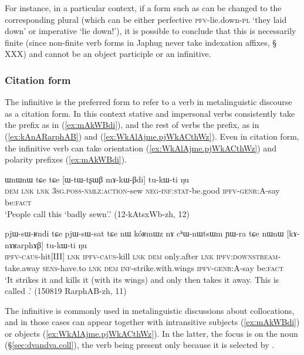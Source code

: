 For instance, in a particular context, if a form such as  can be changed to the corresponding plural  (which can be either perfective \textsc{pfv}-lie.down-\textsc{pl} `they laid down' or imperative `lie down!'), it is possible to conclude that this  is necessarily finite (since non-finite verb forms in Japhug never take indexation affixes, § XXX) and cannot be an object participle or an infinitive.

\subsubsection{Citation form} \label{sec:inf.citation}
The infinitive is the preferred form to refer to a verb in metalinguistic discourse as a citation form. In this context stative and impersonal verbs consistently take the  prefix as in (\ref{ex:mAkWBdi}), and the rest of verbs the  prefix, as in (\ref{ex:kAnARarphAB}) and (\ref{ex:WkAlAjme.pjWkACthWz}). Even in citation form, the infinitive verb can take orientation (\ref{ex:WkAlAjme.pjWkACthWz}) and polarity prefixes (\ref{ex:mAkWBdi}).  

\begin{exe}
\ex  \label{ex:mAkWBdi}
 \gll ɯnɯnɯ tɕe tɕe [ɯ-tɯ-tʂɯβ mɤ-kɯ-βdi] tu-kɯ-ti ŋu \\ 
 \textsc{dem} \textsc{lnk} \textsc{lnk} \textsc{3sg.poss-nmlz:action}-sew \textsc{neg-inf:stat}-be.good  \textsc{ipfv-genr}:A-say be:\textsc{fact}  \\
\glt `People call this `badly sewn'.'  (12-kAtsxWb-zh, 12)
\end{exe}

\begin{exe}
\ex \label{ex:kAnARarphAB}
 \gll  pjɯ-sɯ-ʁndi tɕe pjɯ-sɯ-sat tɕe nɯ kóʁmɯz nɤ cʰɯ-nɯtsɯm ɲɯ-ra tɕe nɯnɯ [kɤ-nɤʁarphɤβ] tu-kɯ-ti ŋu  \\
 \textsc{ipfv-caus}-hit[III]  \textsc{lnk} \textsc{ipfv-caus}-kill \textsc{lnk} \textsc{dem} only.after \textsc{lnk} \textsc{ipfv:downstream}-take.away \textsc{sens}-have.to \textsc{lnk} \textsc{dem} \textsc{inf}-strike.with.wings \textsc{ipfv-genr}:A-say be:\textsc{fact}  \\
 \glt `It strikes it and kills it (with its wings) and only then takes it away. This is called .' (150819 RarphAB-zh, 11)
\end{exe}

The infinitive is commonly used in metalinguistic discussions about collocations, and in those cases can appear together with intransitive subjects (\ref{ex:mAkWBdi}) or objects (\ref{ex:WkAlAjme.pjWkACthWz}). In the latter, the focus is on the noun  (§\ref{sec:dvandva.coll}), the verb  being present only because it is selected by .

